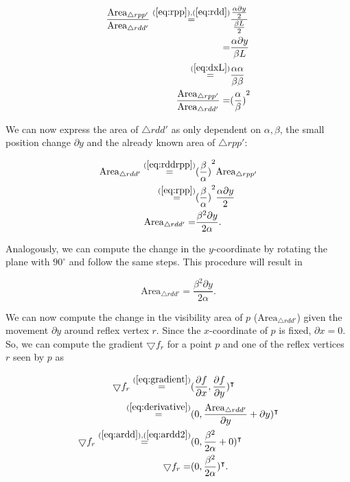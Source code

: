 \begin{align}
    \frac{\text{Area}_{\triangle rpp'}}{\text{Area}_{\triangle rdd'}} \overset{(\ref{eq:rpp}), (\ref{eq:rdd})}{=} &\frac{\frac{\alpha \partial y}{2}}{\frac{\beta L}{2}} \\
    = &\frac{\alpha \partial y}{\beta L} \\
    \overset{(\ref{eq:dxL})}{=} &\frac{\alpha \alpha}{\beta \beta} \\
    \frac{\text{Area}_{\triangle rpp'}}{\text{Area}_{\triangle rdd'}} = &{(\frac \alpha \beta)}^2 \label{eq:rddrpp}
\end{align}

We can now express the area of $\triangle rdd'$ as only dependent on $\alpha, \beta$, the small position change $\partial y$ and the already known area of $\triangle rpp'$:

\begin{align}
    \text{Area}_{\triangle rdd'} \overset{(\ref{eq:rddrpp})}{=} &{(\frac \beta \alpha)}^2 \text{Area}_{\triangle rpp'} \\
    \overset{(\ref{eq:rpp})}{=} &{(\frac \beta \alpha)}^2 \frac{\alpha \partial y}{2} \\
    \text{Area}_{\triangle rdd'} = &\frac{\beta^2 \partial y}{2\alpha}. \label{eq:ardd}
\end{align}

Analogously, we can compute the change in the $y$-coordinate by rotating the plane with $90^\circ$ and follow the same steps. This procedure will result in

\begin{equation}
    \text{Area}_{\triangle rdd'} = \frac{\beta^2 \partial y}{2\alpha}. \label{eq:ardd2}
\end{equation}

We can now compute the change in the visibility area of $p$ ($\text{Area}_{\triangle rdd'}$) given the movement $\partial y$ around reflex vertex $r$. Since the $x$-coordinate of $p$ is fixed, $\partial x = 0$. So, we can compute the gradient $\bigtriangledown f_r$ for a point $p$ and one of the reflex vertices $r$ seen by $p$ as

\begin{align*}
    \bigtriangledown f_r \overset{(\ref{eq:gradient})}{=} &(\frac{\partial f}{\partial x}, \frac{\partial f}{\partial y})^\intercal \\
    \overset{(\ref{eq:derivative})}{=} &(0, \frac{\text{Area}_{\triangle rdd'}}{\partial y} + \partial y)^\intercal \\
    \bigtriangledown f_r \overset{(\ref{eq:ardd}), (\ref{eq:ardd2})}{=} &(0, \frac{\beta^2}{2\alpha} + 0)^\intercal \\
    \bigtriangledown f_r = &(0, \frac{\beta^2}{2\alpha})^\intercal.
\end{align*}

